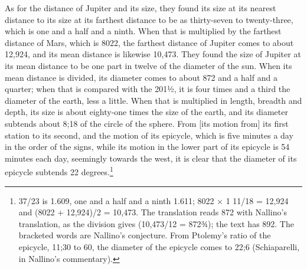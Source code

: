 \documentclass[11pt]{article}
\begin{document}
\par As for the distance of Jupiter and its size, they found its size at its nearest distance to its size at its farthest distance to be as thirty-seven to twenty-three, which is one and a half and a ninth. When that is multiplied by the farthest distance of Mars, which is 8022, the farthest distance of Jupiter comes to about 12,924, and its mean distance is likewise 10,473. They found the size of Jupiter at its mean distance to be one part in twelve of the diameter of the sun. When its mean distance is divided, its diameter comes to about 872 and a half and a quarter; when that is compared with the 201½, it is four times and a third the diameter of the earth, less a little. When that is multiplied in length, breadth and depth, its size is about eighty-one times the size of the earth, and its diameter subtends about 8;18 of the circle of the sphere. From [its motion from] its first station to its second, and the motion of its epicycle, which is five minutes a day in the order of the signs, while its motion in the lower part of its epicycle is 54 minutes each day, seemingly towards the west, it is clear that the diameter of its epicycle subtends 22 degrees.\footnote{37/23 is 1.609, one and a half and a ninth 1.611; 8022 × 1 11/18 = 12,924 and (8022 + 12,924)/2 = 10,473. The translation reads 872 with Nallino's translation, as the division gives (10,473/12 = 872¾); the text has 892. The bracketed words are Nallino's conjecture. From Ptolemy's ratio of the epicycle, 11;30 to 60, the diameter of the epicycle comes to 22;6 (Schiaparelli, in Nallino's commentary).}\par
\end{document}
